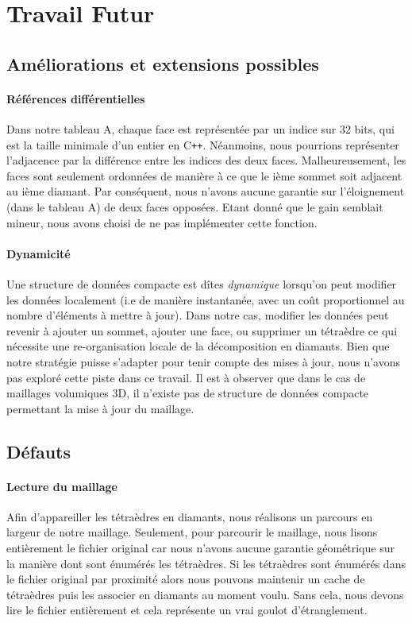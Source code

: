 \section{Travail Futur}
\subsection{Améliorations et extensions possibles}
\paragraph{Références différentielles}
Dans notre tableau A, chaque face est représentée par un indice sur 32 bits, qui est la taille minimale d'un entier en C\texttt{++}. Néanmoins, nous pourrions représenter l'adjacence par la différence entre les indices des deux faces. Malheureusement, les faces sont seulement ordonnées de manière à ce que le ième sommet soit adjacent au ième diamant. Par conséquent, nous n'avons aucune garantie sur l'éloignement (dans le tableau A) de deux faces opposées. Etant donné que le gain semblait mineur, nous avons choisi de ne pas implémenter cette fonction.
\paragraph{Dynamicité}
Une structure de données compacte est dîtes \textit{dynamique} lorsqu'on peut modifier les données localement (i.e de manière instantanée, avec un coût proportionnel au nombre d'éléments à mettre à jour). Dans notre cas, modifier les données peut revenir à ajouter un sommet, ajouter une face, ou supprimer un tétraèdre ce qui nécessite une re-organisation locale de la décomposition en diamants. Bien que notre stratégie puisse s'adapter pour tenir compte des mises à jour, nous n'avons pas exploré cette piste dans ce travail. Il est à observer que dans le cas de maillages volumiques 3D, il n'existe pas de structure de données compacte permettant la mise à jour du maillage.

\subsection{Défauts}
\label{defauts}
\noindent
\paragraph{Lecture du maillage}Afin d'appareiller les tétraèdres en diamants, nous réalisons un parcours en largeur de notre maillage. Seulement, pour parcourir le maillage, nous lisons entièrement le fichier original car nous n'avons aucune garantie géométrique sur la manière dont sont énumérés les tétraèdres. Si les tétraèdres sont énumérés dans le fichier original par proximité alors nous pouvons maintenir un cache de tétraèdres puis les associer en diamants au moment voulu. Sans cela, nous devons lire le fichier entièrement et cela représente un vrai goulot d'étranglement.

